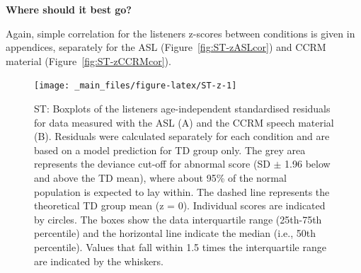 \documentclass[a4paper, twoside]{templates/ociamthesis}
\begin{document}
\begin{correction}
\textbf{Where should it best go?}

Again, simple correlation for the listeners z-scores between conditions
is given in appendices, separately for the ASL
(Figure~\ref{fig:ST-zASLcor}) and CCRM material
(Figure~\ref{fig:ST-zCCRMcor}).
\end{correction}

\begin{figure}

{\centering \texttt{[image: \_main\_files/figure-latex/ST-z-1]} 

}

\caption{ST: Boxplots of the listeners age-independent standardised residuals for data measured with the ASL (A) and the CCRM speech material (B). Residuals were calculated separately for each condition and are based on a model prediction for TD group only. The grey area represents the deviance cut-off for abnormal score (SD $\pm$ 1.96 below and above the TD mean), where about 95\% of the normal population is expected to lay within. The dashed line represents the theoretical TD group mean (z = 0). Individual scores are indicated by circles. The boxes show the data interquartile range (25th-75th percentile) and the horizontal line indicate the median (i.e., 50th percentile). Values that fall within 1.5 times the interquartile range are indicated by the whiskers.}\label{fig:ST-z}
\end{figure}
\end{document}
